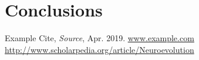 \documentclass[journal, a4paper]{IEEEtran}
\begin{document}

\section{Conclusions}

\blindtext




\begin{thebibliography}{5}

    Example Cite, {\em Source}, Apr. 2019.
    \url{www.example.com}
    \url{http://www.scholarpedia.org/article/Neuroevolution}

\end{thebibliography}
\end{document}
